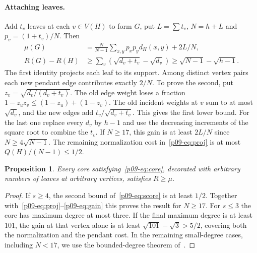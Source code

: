 \documentclass[11pt,a4paper]{article}
\newtheorem{proposition}[theorem]{Proposition}
\begin{document}
\paragraph{Attaching leaves.}
Add $t_v$ leaves at each $v\in V(H)$ to form $G$, put $L=\sum t_v$,
$N=h+L$ and $p_v=(1+t_v)/N$. Then
\begin{align}
 \mu(G)&=\frac{N}{N-1}\sum_{x,y}p_xp_y d_H(x,y)+2L/N,\label{p09-eq:proj}\\
 R(G)-R(H)&\ge\sum_v(\sqrt{d_v+t_v}-\sqrt{d_v})
 \ge\sqrt{N-1}-\sqrt{h-1}.\label{p09-eq:gain}
\end{align}
The first identity projects each leaf to its support. Among distinct
vertex pairs each new pendant edge contributes exactly $2/N$. To prove
the second, put $z_v=\sqrt{d_v/(d_v+t_v)}$. The old edge weight loses a
fraction $1-z_uz_v\le(1-z_u)+(1-z_v)$. The old incident weights at $v$
sum to at most $\sqrt{d_v}$, and the new edges add $t_v/\sqrt{d_v+t_v}$.
This gives the first lower bound. For the last one replace every $d_v$
by $h-1$ and use the decreasing increments of the square root to combine
the $t_v$. If $N\ge17$, this gain is at least $2L/N$ since
$N\ge4\sqrt{N-1}$. The remaining normalization cost in~\eqref{p09-eq:proj}
is at most $Q(H)/(N-1)\le1/2$.

\begin{proposition}\label{p09-prop:single}
Every core satisfying~\eqref{p09-eq:core}, decorated with arbitrary numbers
of leaves at arbitrary vertices, satisfies $R\ge\mu$.
\end{proposition}
\begin{proof}
If $s\ge4$, the second bound of~\eqref{p09-eq:score} is at least $1/2$.
Together with~\eqref{p09-eq:proj}--\eqref{p09-eq:gain} this proves the result
for $N\ge17$. For $s\le3$ the core has maximum degree at most three.
If the final maximum degree is at least $101$, the gain at that vertex
alone is at least $\sqrt{101}-\sqrt3>5/2$, covering both the normalization
and the pendant cost. In the remaining small-degree cases, including
$N<17$, we use the bounded-degree theorem of~\cite[Theorem 3.2]{p09-Threshold}.
\end{proof}
\end{document}
